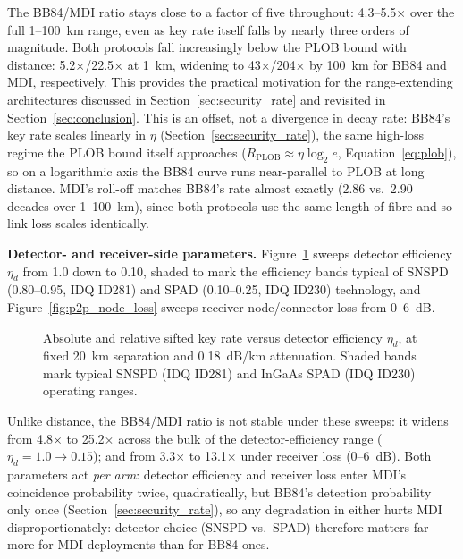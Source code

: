 \documentclass[12pt]{article}
\begin{document}
The BB84/MDI ratio stays close to a factor of five throughout: 4.3--5.5$\times$ over the full 1--100~km range, even as key rate itself falls by nearly three orders of magnitude. Both protocols fall increasingly below the PLOB bound with distance: 5.2$\times$/22.5$\times$ at 1~km, widening to 43$\times$/204$\times$ by 100~km for BB84 and MDI, respectively. This provides the practical motivation for the range-extending architectures discussed in Section~\ref{sec:security_rate} and revisited in Section~\ref{sec:conclusion}. This is an offset, not a divergence in decay rate: BB84's key rate scales linearly in $\eta$ (Section~\ref{sec:security_rate}), the same high-loss regime the PLOB bound itself approaches ($R_\text{PLOB} \approx \eta \log_2 e$, Equation~\ref{eq:plob}), so on a logarithmic axis the BB84 curve runs near-parallel to PLOB at long distance. MDI's roll-off matches BB84's rate almost exactly (2.86 vs.\ 2.90 decades over 1--100~km), since both protocols use the same length of fibre and so link loss scales identically.

\textbf{Detector- and receiver-side parameters.} Figure~\ref{fig:p2p_efficiency} sweeps detector efficiency $\eta_d$ from 1.0 down to 0.10, shaded to mark the efficiency bands typical of SNSPD (0.80--0.95, IDQ ID281) and SPAD (0.10--0.25, IDQ ID230) technology, and Figure~\ref{fig:p2p_node_loss} sweeps receiver node/connector loss from 0--6~dB.

\begin{figure}[h]
    \centering
    
    \caption{Absolute and relative sifted key rate versus detector efficiency $\eta_d$, at fixed 20~km separation and 0.18~dB/km attenuation. Shaded bands mark typical SNSPD (IDQ ID281) and InGaAs SPAD (IDQ ID230) operating ranges.}
    \label{fig:p2p_efficiency}
\end{figure}

Unlike distance, the BB84/MDI ratio is not stable under these sweeps: it widens from 4.8$\times$ to 25.2$\times$ across the bulk of the detector-efficiency range ($\eta_d=1.0\to0.15$); and from 3.3$\times$ to 13.1$\times$ under receiver loss (0--6~dB). Both parameters act \emph{per arm}: detector efficiency and receiver loss enter MDI's coincidence probability twice, quadratically, but BB84's detection probability only once (Section~\ref{sec:security_rate}), so any degradation in either hurts MDI disproportionately: detector choice (SNSPD vs.\ SPAD) therefore matters far more for MDI deployments than for BB84 ones.
\end{document}
